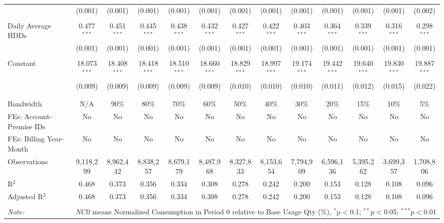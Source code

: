 \begin{table}[!htbp]
\begin{adjustbox}{scale = 0.8}
\begin{tabular}{@{\extracolsep{5pt}}lcccccccccccc}
  & (0.001) & (0.001) & (0.001) & (0.001) & (0.001) & (0.001) & (0.001) & (0.001) & (0.001) & (0.001) & (0.001) & (0.002) \\ 
  & & & & & & & & & & & & \\ 
 Daily Average HDDs & 0.477$^{***}$ & 0.451$^{***}$ & 0.445$^{***}$ & 0.438$^{***}$ & 0.432$^{***}$ & 0.427$^{***}$ & 0.422$^{***}$ & 0.403$^{***}$ & 0.364$^{***}$ & 0.339$^{***}$ & 0.316$^{***}$ & 0.298$^{***}$ \\ 
  & (0.001) & (0.001) & (0.001) & (0.001) & (0.001) & (0.001) & (0.001) & (0.001) & (0.001) & (0.001) & (0.001) & (0.001) \\ 
  & & & & & & & & & & & & \\ 
 Constant & 18.073$^{***}$ & 18.408$^{***}$ & 18.418$^{***}$ & 18.510$^{***}$ & 18.660$^{***}$ & 18.829$^{***}$ & 18.997$^{***}$ & 19.174$^{***}$ & 19.442$^{***}$ & 19.640$^{***}$ & 19.830$^{***}$ & 19.887$^{***}$ \\ 
  & (0.009) & (0.009) & (0.009) & (0.009) & (0.009) & (0.010) & (0.010) & (0.010) & (0.011) & (0.012) & (0.015) & (0.022) \\ 
  & & & & & & & & & & & & \\ 
\hline \\[-1.8ex] 
Bandwidth & N/A & 90\% & 80\% & 70\% & 60\% & 50\% & 40\% & 30\% & 20\% & 15\% & 10\% & 5\% \\ 
FEs: Account-Premise IDs & No & No & No & No & No & No & No & No & No & No & No & No \\ 
FEs: Billing Year-Month & No & No & No & No & No & No & No & No & No & No & No & No \\ 
Observations & 9,118,299 & 8,962,442 & 8,838,257 & 8,679,179 & 8,487,968 & 8,327,833 & 8,153,654 & 7,794,909 & 6,596,136 & 5,395,262 & 3,699,357 & 1,708,806 \\ 
R$^{2}$ & 0.468 & 0.373 & 0.356 & 0.334 & 0.308 & 0.278 & 0.242 & 0.200 & 0.153 & 0.128 & 0.108 & 0.096 \\ 
Adjusted R$^{2}$ & 0.468 & 0.373 & 0.356 & 0.334 & 0.308 & 0.278 & 0.242 & 0.200 & 0.153 & 0.128 & 0.108 & 0.096 \\ 
\hline 
\hline \\[-1.8ex] 
\textit{Note:}  & \multicolumn{12}{r}{$NC0$ means Normalized Consumption in Period 0 relative to Base Usage Qty (\%), $^{*}$p$<$0.1; $^{**}$p$<$0.05; $^{***}$p$<$0.01} \\ 
\end{tabular} 
\end{adjustbox}
\end{table} 
